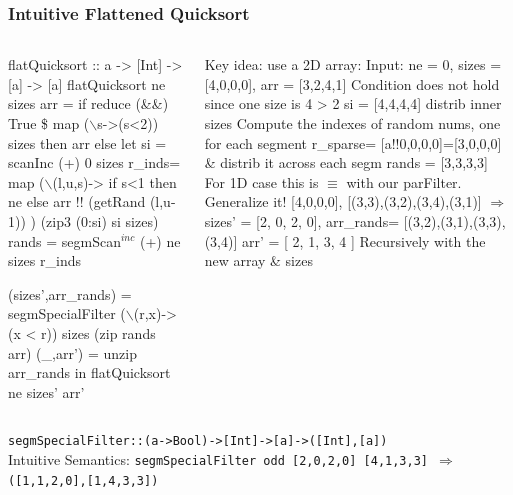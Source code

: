 \documentclass{beamer}
\newcommand{\emp}[1]{\textcolor{DikuRed}{ #1}}
\newcommand{\mymath}[1]{$ #1 $}
\newcommand{\myindu}[1]{^{#1}}
\begin{document}
\begin{frame}[fragile,t]
  \frametitle{Intuitive Flattened Quicksort}

\begin{columns}
\begin{colorcode}[fontsize=\scriptsize]
flatQuicksort :: a -> [Int] -> [a] -> [a]
flatQuicksort \alert{ne sizes} arr = 
  if reduce (\&\&) True \$ 
         map (\mymath{\backslash}s->(s<2)) sizes 
  then arr else 
  let si = scanInc (+) 0 sizes
      r_inds= 
        map (\mymath{\backslash}(l,u,s)-> 
                if s<1 then ne else 
                     arr !! (getRand (l,u-1))
            )  (zip3 (0:si) si sizes)
      rands = segmScan\mymath{\myindu{inc}} (+) ne sizes r_inds

      (sizes',arr_rands) = segmSpecialFilter 
                  (\mymath{\backslash}(r,x)->(x < r)) 
                  sizes (zip rands arr)
      (_,arr') = unzip arr_rands
  in  flatQuicksort ne sizes' arr'
\end{colorcode}
\pause
\begin{colorcode}[fontsize=\scriptsize]
Key idea: use a 2D array:
Input: ne = 0, sizes = [4,0,0,0], 
               arr   = [3,2,4,1]
Condition does not hold 
since one size is 4 > 2
si = [4,4,4,4] distrib inner sizes
\emp{Compute the indexes of random}
\emp{   nums, one for each segment}
r_sparse= [a!!0,0,0,0]=[3,0,0,0]
\emp{\& distrib it across each segm}
rands   = [3,3,3,3] 
\emp{For 1D case this is \mymath{\equiv}}
\emp{ with our parFilter.} \alert{Generalize it!}
[4,0,0,0], [(3,3),(3,2),(3,4),(3,1)] \mymath{\Rightarrow}
sizes' =   [2,    0,    2,    0], 
arr_rands= [(3,2),(3,1),(3,3),(3,4)]
arr'     = [   2,    1,    3,    4 ]
\emp{Recursively with the new array \& sizes}
\end{colorcode}
\end{columns}
\medskip

{\tt segmSpecialFilter::(a->Bool)->[Int]->[a]->([Int],[a])}\\
\alert{Intuitive Semantics:} 
\alert{\tt segmSpecialFilter odd [2,0,2,0] [4,1,3,3] $\Rightarrow$ ([1,1,2,0],[1,4,3,3])}

\end{frame}

\begin{frame}[fragile]
	\tableofcontents
\end{frame}
\end{document}
